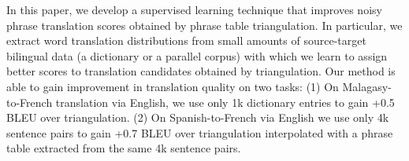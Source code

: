 In this paper, we develop a supervised learning technique that improves noisy phrase translation scores obtained by phrase table triangulation. In particular, we extract word translation distributions from small amounts of source-target bilingual data (a dictionary or a parallel corpus) with which we learn to assign better scores to translation candidates obtained by triangulation. Our method is able to gain improvement in translation quality on two tasks: (1) On Malagasy-to-French translation via English, we use only 1k dictionary entries to gain +0.5 BLEU over triangulation. (2) On Spanish-to-French via English we use only 4k sentence pairs to gain +0.7 BLEU over triangulation interpolated with a phrase table extracted from the same 4k sentence pairs.
